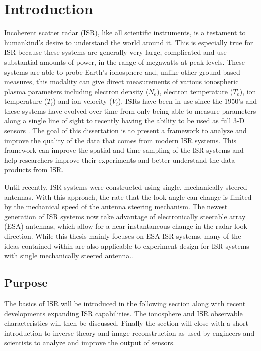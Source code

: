 \chapter{Introduction}
\label{chapter:body}
\thispagestyle{myheadings}
\setcounter{tocdepth}{1}
\graphicspath{{1_Intro/Figures/}}

Incoherent scatter radar (ISR), like all scientific instruments, is a testament to humankind's desire to understand the world around it. This is especially true for ISR because these systems are generally very large, complicated and use substantial amounts of power, in the range of megawatts at peak levels. These systems are able to probe Earth's ionosphere and, unlike other ground-based measures, this modality can give direct measurements of various ionospheric plasma parameters including electron density ($N_e$), electron temperature ($T_e$), ion temperature ($T_i$) and ion velocity ($V_i$). ISRs have been in use since the 1950's \citep{gordon58} and these systems have evolved over time from only being able to measure parameters along a single line of sight to recently having the ability to be used as full 3-D sensors \citep{Semeter2009738,Nicolls:2007ie}. The goal of this dissertation is to present a framework to analyze and improve the quality of the data that comes from modern ISR systems. This framework can  improve the spatial and time sampling of the ISR systems and help researchers improve their experiments and better understand the data products from ISR.

Until recently, ISR systems were constructed using single, mechanically steered antennas. With this approach, the rate that the look angle can change is limited by the mechanical speed of the antenna steering mechanism. The newest generation of ISR systems now take advantage of electronically steerable array (ESA) antennas, which allow for a near instantaneous change in the radar look direction. While this thesis mainly focuses on ESA ISR systems, many of the ideas contained within are also applicable to experiment design for ISR systems with single mechanically steered antenna.. 
 
\section{Purpose}
The basics of ISR will be introduced in the following section along with recent developments expanding ISR capabilities. The ionosphere and ISR observable characteristics will then be discussed. Finally the section will close with a short introduction to inverse theory and image reconstruction as used by engineers and scientists to analyze and improve the output of sensors.

